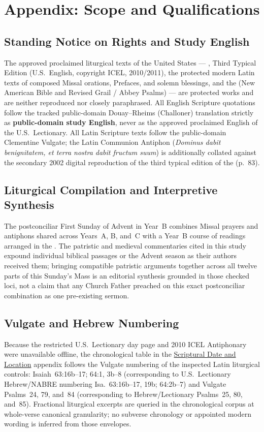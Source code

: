 \section{Appendix: Scope and Qualifications}

\subsection{Standing Notice on Rights and Study English}
The approved proclaimed liturgical texts of the United States --- , Third Typical Edition (U.S.\ English, copyright ICEL, 2010/2011), the protected modern Latin texts of composed Missal orations, Prefaces, and solemn blessings, and the  (New American Bible and Revised Grail / Abbey Psalms) --- are protected works and are neither reproduced nor closely paraphrased. All English Scripture quotations follow the tracked public-domain Douay--Rheims (Challoner) translation strictly as \textbf{public-domain study English}, never as the approved proclaimed English of the U.S.\ Lectionary. All Latin Scripture texts follow the public-domain Clementine Vulgate; the Latin Communion Antiphon (\emph{Dominus dabit benignitatem, et terra nostra dabit fructum suum}) is additionally collated against the secondary 2002 digital reproduction of the third typical edition of the  (p.~83).

\subsection{Liturgical Compilation and Interpretive Synthesis}
The postconciliar First Sunday of Advent in Year~B combines Missal prayers and antiphons shared across Years~A, B, and~C with a Year~B course of readings arranged in the . The patristic and medieval commentaries cited in this study expound individual biblical passages or the Advent season as their authors received them; bringing compatible patristic arguments together across all twelve parts of this Sunday's Mass is an editorial synthesis grounded in those checked loci, not a claim that any Church Father preached on this exact postconciliar combination as one pre-existing sermon.

\subsection{Vulgate and Hebrew Numbering}
Because the restricted U.S.\ Lectionary day page and 2010 ICEL Antiphonary were unavailable offline, the chronological table in the \hyperref[sec:date-location]{Scriptural Date and Location} appendix follows the Vulgate numbering of the inspected Latin liturgical controls: Isaiah~63:16b--17; 64:1, 3b--8 (corresponding to U.S.\ Lectionary Hebrew/NABRE numbering Isa.~63:16b--17, 19b; 64:2b--7) and Vulgate Psalms~24, 79, and~84 (corresponding to Hebrew/Lectionary Psalms~25, 80, and~85). Fractional liturgical excerpts are queried in the chronological corpus at whole-verse canonical granularity; no subverse chronology or appointed modern wording is inferred from those envelopes.

